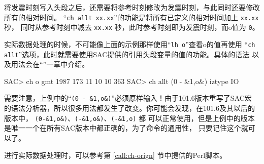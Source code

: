 将发震时刻写入头段之后，还需要将参考时刻修改为发震时刻，与此同时还要修改所有的相对时间。
``\texttt{ch allt xx.xx}''的功能是将所有已定义的相对时间加上 \texttt{xx.xx} 秒，
同时从参考时刻中减去 \texttt{xx.xx} 秒，此时参考时刻即为发震时刻，而o值为 \texttt{0}。

实际数据处理的时候，不可能像上面的示例那样使用``\texttt{lh o}''查看o的值再使用
``\texttt{ch allt}''选项，此时就需要使用SAC提供的引用头段变量的值的功能。具体的语法
以及用法会在``''一章中介绍。

\begin{SACCode}
SAC> ch o gmt 1987 173 11 10 10 363
SAC> ch allt (0 - &1,o&) iztype IO
\end{SACCode}

需要注意，上例中的``\verb|(0 - &1,o&)|''必须原样输入！由于101.6版本重写了SAC宏
的语法分析器，所以很多用法都发生了改变。你可能会发现，在101.6及其以后的版本中，
\verb|(0-&1,o&)|、\verb|(-&1,o&)|、\verb|(-&1,o)| 都
可以正常使用，但是上例中的版本是唯一一个在所有SAC版本中都正确的，为了命令的通用性，
只要记住这个就可以了。

进行实际数据处理时，可以参考第 \ref{call:ch-orign} 节中提供的Perl脚本。
